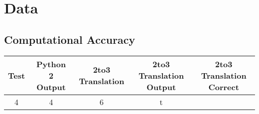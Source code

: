 \section{Data}
\label{appendix:Data}
\subsection{Computational Accuracy}
\begin{table}
\begin{tabular}[center]{|c|c|c|c|c|}
    Test & Python 2 Output & 2to3 Translation & 2to3 Translation Output & 2to3 Translation Correct \\
    \hline
    4 & 4 & 6 & t
\end{tabular}
\end{table}